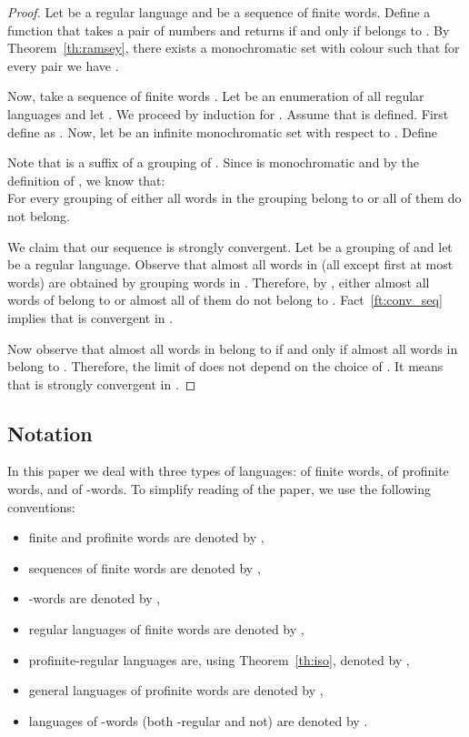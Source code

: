 \documentclass{LMCS}
\begin{document}
\begin{proof}
Let  be a regular language and  be a sequence of finite words. Define a function  that takes a pair of numbers  and returns  if and only if  belongs to . By Theorem~\ref{th:ramsey}, there exists a monochromatic set  with colour  such that for every pair  we have .

Now, take a sequence of finite words . Let  be an enumeration of all regular languages and let . We proceed by induction for . Assume that  is defined. First define  as . Now, let  be an infinite monochromatic set with respect to . Define 


Note that  is a suffix of a grouping of . Since  is monochromatic and by the definition of , we know that:\\
 For every grouping of  either all words in the grouping belong to  or all of them do not belong.

We claim that our sequence  is strongly convergent. Let  be a grouping of  and let  be a regular language. Observe that almost all words in  (all except first at most  words) are obtained by grouping words in . Therefore, by , either almost all words of  belong to  or almost all of them do not belong to . Fact~\ref{ft:conv_seq} implies that  is convergent in .

Now observe that almost all words in  belong to  if and only if almost all words in  belong to . Therefore, the limit of  does not depend on the choice of . It means that  is strongly convergent in .
\end{proof}

\subsection{Notation}

In this paper we deal with three types of languages: of finite words, of profinite words, and of -words. To simplify reading of the paper, we use the following conventions:
\begin{itemize}
\item finite and profinite words are denoted by ,
\item sequences of finite words are denoted by ,
\item -words are denoted by ,
\item regular languages of finite words are denoted by ,
\item profinite-regular languages are, using Theorem~\ref{th:iso}, denoted by ,
\item general languages of profinite words are denoted by ,
\item languages of -words (both -regular and not) are denoted by .
\end{itemize}
\end{document}
